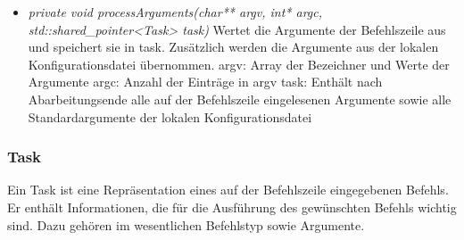 \documentclass[a4paper,12pt]{article}
\begin{document}
\begin{itemize}[label={}]
\begin{itemize}[label={\textbullet}]
			\item \textit{private void processArguments(char** argv, int* argc, std::shared\_pointer<Task> task)}
			Wertet die Argumente der Befehlszeile aus und speichert sie in task.\newline
			Zusätzlich werden die Argumente aus der lokalen Konfigurationsdatei übernommen.\newline
			\newline
			argv: Array der Bezeichner und Werte der Argumente\newline
			argc: Anzahl der Einträge in argv\newline
			task: Enthält nach Abarbeitungsende alle auf der Befehlszeile eingelesenen Argumente sowie alle Standardargumente der lokalen Konfigurationsdatei


		\end{itemize}


\end{itemize}

\clearpage

\subsubsection{Task}

Ein Task ist eine Repräsentation eines auf der Befehlszeile eingegebenen Befehls. Er enthält Informationen, die für die Ausführung des gewünschten Befehls wichtig sind. Dazu gehören im wesentlichen Befehlstyp sowie Argumente.
\end{document}
